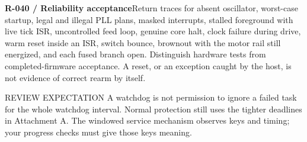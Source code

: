 \documentclass[10pt]{article}
\newcommand{\Clause}[2]{\par\noindent\textbf{#1}\quad #2\par}
\begin{document}
\Clause{R-040 / Reliability acceptance}{Return traces for absent oscillator, worst-case startup, legal and illegal PLL plans, masked interrupts, stalled foreground with live tick ISR, uncontrolled feed loop, genuine core halt, clock failure during drive, warm reset inside an ISR, switch bounce, brownout with the motor rail still energized, and each fused branch open. Distinguish hardware tests from completed-firmware acceptance. A reset, or an exception caught by the host, is not evidence of correct rearm by itself.}
\begin{Notice}{REVIEW EXPECTATION}
A watchdog is not permission to ignore a failed task for the whole watchdog interval. Normal protection still uses the tighter deadlines in Attachment A. The windowed service mechanism observes keys and timing; your progress checks must give those keys meaning.
\end{Notice}
\vfill{}
\end{document}
